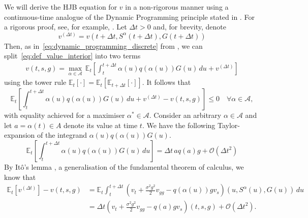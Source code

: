 \documentclass[main.tex]{subfiles}
\begin{document}
We will derive the HJB equation for $v$ in a non-rigorous manner
using a
continuous-time analogue of the Dynamic Programming principle
stated in . For a rigorous proof,
see, for example, \citet[Ch.~3]{pham2009continuous}.
Let $\Delta{t}>0$ and, for brevity, denote
\begin{equation}
  v^{(\Delta{t})} =
  v(t+\Delta{t},S^\alpha(t+\Delta{t}),G(t+\Delta{t}))
\end{equation}
Then, as in~\eqref{eq:dynamic_programming_discrete} from
, we can
split~\eqref{eq:def_value_interior} into two terms
\begin{align}
  v(t,s,g) = \max_{\alpha\in\mathcal{A}}\,
  \mathbb{E}_{t}\left[
  \int_t^{t+\Delta{t}} \alpha(u)q(\alpha(u))G(u)\,du
  + v^{(\Delta{t})}\right]
\end{align}
using the tower rule $\mathbb{E}_t[\cdot] = \mathbb{E}_t[\mathbb{E}_{t+\Delta{t}}[\cdot]]$.
It follows that
\begin{equation}
  \label{eq:cts_bellman_principle_ineq}
  \mathbb{E}_{t}\left[
    \int_t^{t+\Delta{t}} \alpha(u)q(\alpha(u))G(u)\,du
    + v^{(\Delta{t})}-v(t,s,g)\right]
  \leq 0\quad  \forall \alpha\in\mathcal{A},
\end{equation}
with equality achieved for a maximiser $\alpha^*\in\mathcal{A}$.
Consider an arbitrary $\alpha\in\mathcal{A}$ and let $a=\alpha(t)\in
A$ denote its value at time $t$.
We have the following Taylor-expansion of the
integrand $\alpha(u)q(\alpha(u))G(u)$.
\begin{equation}
  \mathbb{E}_{t}\left[
    \int_t^{t+\Delta{t}}
    \alpha(u)q(\alpha(u))G(u)\,du\right]
  = \Delta{t}\,aq(a)g  + \mathcal{O}({\Delta{t}}^2)
\end{equation}
By It\^{o}'s lemma \citep[Ch.~1]{pham2009continuous}, a
generalisation of the fundamental theorem of calculus, we know that
\begin{align}
  \mathbb{E}_t[v^{(\Delta{t})}]-v(t,s,g)
  &= \mathbb{E}_t  \int_t^{t+\Delta{t}}
    (v_t
    +{\textstyle\frac{\sigma^2g^2}{2}}
    v_{gg}
    -q(\alpha(u))g v_s)(u,S^{\alpha}(u),G(u))
    \,du\\
  &= \Delta{t}\left( v_t
    +{\textstyle\frac{\sigma^2g^2}{2}}
    v_{gg}
    -q(a)g v_s \right)(t,s,g) + \mathcal{O}({\Delta{t}}^2).
\end{align}
\end{document}

